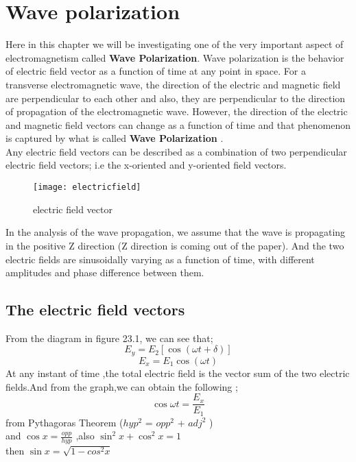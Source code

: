 \chapter{Wave polarization}
Here in this chapter we will be investigating one of the very important aspect of electromagnetism called \textbf{Wave Polarization}. Wave polarization is the behavior of electric field vector as a function of time at any point in space.
For a transverse electromagnetic wave, the direction of the electric and magnetic field are perpendicular to each other and also, they are perpendicular to the direction of propagation of the electromagnetic wave. However, the direction of the electric and magnetic field vectors can change as a function of time and that phenomenon is captured by what is called \textbf{Wave Polarization} .\\
Any electric field vectors can be described as a combination of two perpendicular electric field vectors; i.e the x-oriented and y-oriented field vectors. 

\begin{figure}
	\centering
	\texttt{[image: electricfield]}
	\caption{electric field vector}
\end{figure}
In the analysis of the wave propagation, we assume that the wave is propagating in the positive Z direction (Z direction is coming out of the paper). And the two electric fields are sinusoidally varying as a function of time, with different amplitudes and phase difference between them.	
\section{The electric field vectors} From the diagram in figure 23.1,
we can see that;
\begin{equation}
E_y = E_2 [\cos(\omega t + \delta )]
\end{equation}
\begin{equation}
E_x = E_1 \cos(\omega t)
\end{equation}
At any instant of time ,the total electric field is the vector sum of the two electric  fields.And from the graph,we can obtain the following ;
\begin{equation}
  \cos {\omega t} = \frac {E_x}{E_1} 
\end{equation}
  from Pythagoras Theorem ($hyp^2$ = $opp^2$ + $adj^2$ )\\
  and $ \cos x = \frac{opp}{hyp}$ ,also $\sin^2 x + \cos^2 x = 1$ \\
  then $\sin x = \sqrt{1-cos^ 2x}$\\
  
